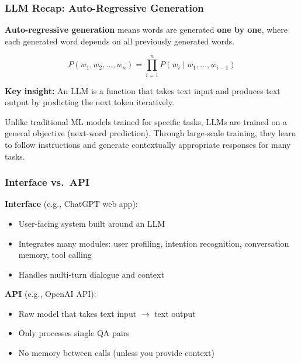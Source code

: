 \bigseparator

\subsubsection{LLM Recap: Auto-Regressive Generation}

\begin{defbox}
\textbf{Auto-regressive generation} means words are generated \textbf{one by one}, where each generated word depends on all previously generated words.

\[
P(w_1, w_2, \ldots, w_n) = \prod_{i=1}^{n} P(w_i \mid w_1, \ldots, w_{i-1})
\]

\textbf{Key insight:} An LLM is a function that takes text input and produces text output by predicting the next token iteratively.
\end{defbox}

\begin{tipbox}
Unlike traditional ML models trained for specific tasks, LLMs are trained on a general objective (next-word prediction). Through large-scale training, they learn to follow instructions and generate contextually appropriate responses for many tasks.
\end{tipbox}

\bigseparator

\subsubsection{Interface vs.\ API}

\begin{defbox}
\textbf{Interface} (e.g., ChatGPT web app):
\begin{itemize}
  \item User-facing system built around an LLM
  \item Integrates many modules: user profiling, intention recognition, conversation memory, tool calling
  \item Handles multi-turn dialogue and context
\end{itemize}

\textbf{API} (e.g., OpenAI API):
\begin{itemize}
  \item Raw model that takes text input $\to$ text output
  \item Only processes single QA pairs
  \item No memory between calls (unless you provide context)
\end{itemize}
\end{defbox}

